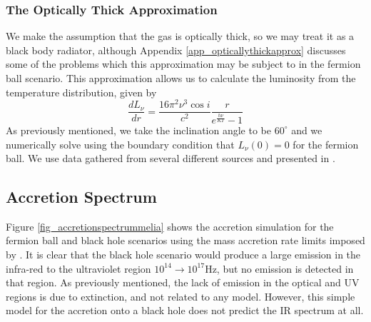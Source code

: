 \subsubsection{The Optically Thick Approximation}
We make the assumption that the gas is optically thick, so we may treat it as a black body radiator, although Appendix
\ref{app_opticallythickapprox} discusses some of the problems which this approximation may be subject to in the fermion ball scenario.
This approximation allows us to calculate the luminosity from the temperature distribution, given by
\begin{equation}
	\frac{dL_\nu}{dr}=\frac{16\pi^2 \nu^3\cos{i}}{c^2}\frac{r}{e^{\frac{h\nu}{KT}}-1}
	\label{eqn_opticallythick}
\end{equation}
As previously mentioned, we take the inclination angle to be $60^\circ$ and we numerically solve using the boundary condition that
$L_\nu(0)=0$ for the fermion ball. We use data gathered from several different sources and presented in \cite{ref_cokerthesis}. 

\subsection{Accretion Spectrum}
Figure \ref{fig_accretionspectrummelia} shows the accretion simulation for the fermion ball and black hole scenarios using the mass
accretion rate limits imposed by \cite{ref_melia}. It is clear that the black hole scenario would produce a large emission in the
infra-red to the ultraviolet region $10^{14}\rightarrow 10^{17}$Hz, but no emission is detected in that region. As previously mentioned,
the lack of emission in the optical and UV regions is due to extinction, and not related to any model. However, this simple model for the
accretion onto a black hole does not predict the IR spectrum at all.

